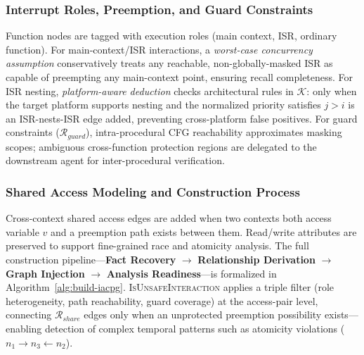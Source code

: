 \documentclass[conference]{IEEEtran}
\begin{document}
\subsubsection{Interrupt Roles, Preemption, and Guard Constraints}

Function nodes are tagged with execution roles (main context, ISR, ordinary function). For main-context/ISR interactions, a \textit{worst-case concurrency assumption} conservatively treats any reachable, non-globally-masked ISR as capable of preempting any main-context point, ensuring recall completeness. For ISR nesting, \textit{platform-aware deduction} checks architectural rules in $\mathcal{K}$: only when the target platform supports nesting and the normalized priority satisfies $j > i$ is an ISR-nests-ISR edge added, preventing cross-platform false positives. For guard constraints ($\mathcal{R}_{guard}$), intra-procedural CFG reachability approximates masking scopes; ambiguous cross-function protection regions are delegated to the downstream agent for inter-procedural verification.

\subsubsection{Shared Access Modeling and Construction Process}

Cross-context shared access edges are added when two contexts both access variable $v$ and a preemption path exists between them. Read/write attributes are preserved to support fine-grained race and atomicity analysis. The full construction pipeline---\textbf{Fact Recovery} $\to$ \textbf{Relationship Derivation} $\to$ \textbf{Graph Injection} $\to$ \textbf{Analysis Readiness}---is formalized in Algorithm~\ref{alg:build-iacpg}. \textsc{IsUnsafeInteraction} applies a triple filter (role heterogeneity, path reachability, guard coverage) at the access-pair level, connecting $\mathcal{R}_{share}$ edges only when an unprotected preemption possibility exists---enabling detection of complex temporal patterns such as atomicity violations ($n_1 \to n_3 \gets n_2$).
\end{document}
